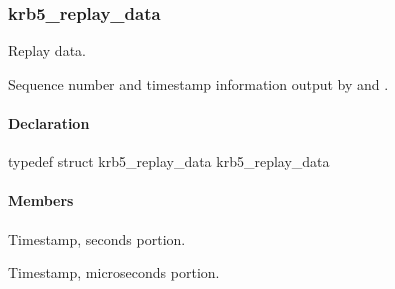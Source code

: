 \documentclass[letterpaper,10pt,english]{sphinxmanual}
\begin{document}
\subsubsection{krb5\_replay\_data}
\label{appdev/refs/types/krb5_replay_data:krb5-replay-data}\label{appdev/refs/types/krb5_replay_data:krb5-replay-data-struct}\label{appdev/refs/types/krb5_replay_data::doc}

\begin{fulllineitems}
\label{appdev/refs/types/krb5_replay_data:c.krb5_replay_data}
\end{fulllineitems}


Replay data.

Sequence number and timestamp information output by {\hyperref[appdev/refs/api/krb5_rd_priv:c.krb5_rd_priv]{}} and {\hyperref[appdev/refs/api/krb5_rd_safe:c.krb5_rd_safe]{}} .


\paragraph{Declaration}
\label{appdev/refs/types/krb5_replay_data:declaration}
typedef struct krb5\_replay\_data  krb5\_replay\_data


\paragraph{Members}
\label{appdev/refs/types/krb5_replay_data:members}

\begin{fulllineitems}
\label{appdev/refs/types/krb5_replay_data:c.krb5_replay_data.timestamp}
Timestamp, seconds portion.

\end{fulllineitems}


\begin{fulllineitems}
\label{appdev/refs/types/krb5_replay_data:c.krb5_replay_data.usec}
Timestamp, microseconds portion.

\end{fulllineitems}
\end{document}
